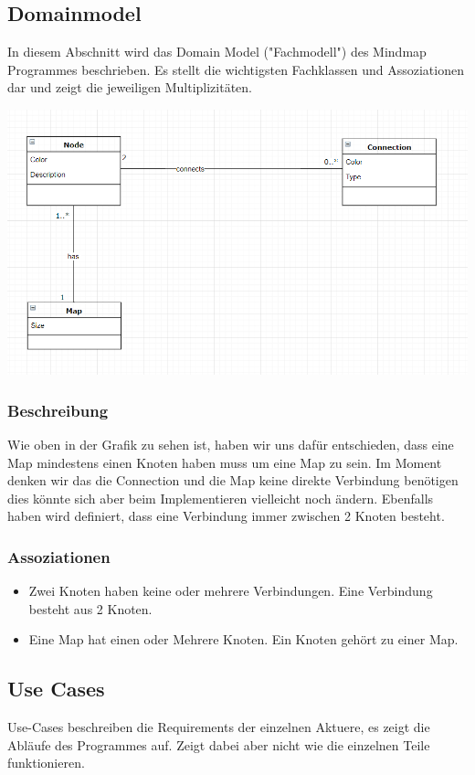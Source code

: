 \documentclass[a4paper,parskip]{scrartcl}
\begin{document}
\subsection{Domainmodel}
In diesem Abschnitt wird das Domain Model ("Fachmodell") des Mindmap Programmes beschrieben. Es stellt die 
wichtigsten Fachklassen und Assoziationen dar und zeigt die jeweiligen Multiplizitäten.

\includegraphics[width=\linewidth]{DomainModel.PNG}

\subsubsection{Beschreibung}
Wie oben in der Grafik zu sehen ist, haben wir uns dafür entschieden, dass eine Map mindestens einen Knoten haben muss um eine Map zu sein. Im Moment denken wir das die Connection und die Map keine direkte Verbindung benötigen dies könnte sich aber beim Implementieren vielleicht noch ändern. Ebenfalls haben wird definiert, dass eine Verbindung immer zwischen 2 Knoten besteht.

\subsubsection{Assoziationen}
\begin{itemize}
\item Zwei Knoten haben keine oder mehrere Verbindungen. Eine Verbindung besteht aus 2 Knoten.
\item Eine Map hat einen oder Mehrere Knoten. Ein Knoten gehört zu einer Map.
\end{itemize}

\subsection{Use Cases}
Use-Cases beschreiben die Requirements der einzelnen Aktuere, es zeigt die Abläufe des Programmes auf. Zeigt dabei aber nicht wie die einzelnen Teile funktionieren.
\end{document}
